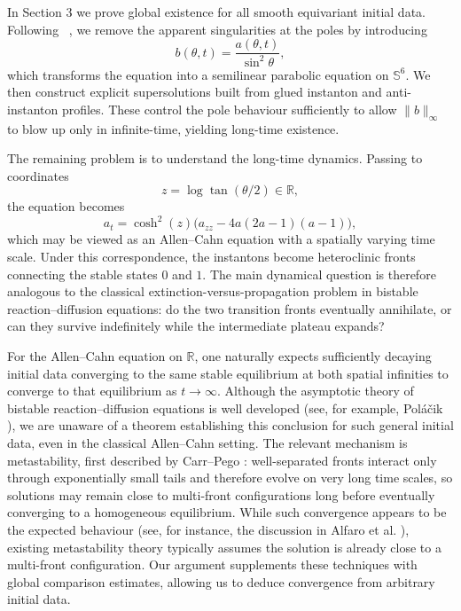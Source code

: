 \documentclass[11pt,a4paper]{article}
\numberwithin{equation}{section}
\theoremstyle{plain}
\theoremstyle{remark}
\begin{document}
In Section 3 we prove global existence for all smooth equivariant initial data. Following ~\cite{67fa8f92-32f2-39c3-bd3f-c407da60a7c7,Waldron2014Thesis}, we remove the apparent singularities at the poles by introducing
$$
b(\theta,t)=\frac{a(\theta,t)}{\sin^2\theta},
$$
which transforms the equation into a semilinear parabolic equation on $\mathbb{S}^6$. We then construct explicit supersolutions built from glued instanton and anti-instanton profiles. These control the pole behaviour sufficiently to allow $\|b\|_\infty$ to blow up only in infinite-time, yielding long-time existence.

The remaining problem is to understand the long-time dynamics. Passing to coordinates
$$
z=\log\tan(\theta/2)\in\mathbb{R},
$$
the equation becomes
\begin{equation}\label{coshAC}
a_t=\cosh^2(z)\bigl(a_{zz}-4a(2a-1)(a-1)\bigr),
\end{equation}
which may be viewed as an Allen–Cahn equation with a spatially varying time scale. Under this correspondence, the instantons become heteroclinic fronts connecting the stable states $0$ and $1$. The main dynamical question is therefore analogous to the classical extinction-versus-propagation problem in bistable reaction–diffusion equations: do the two transition fronts eventually annihilate, or can they survive indefinitely while the intermediate plateau expands?


For the Allen–Cahn equation on $\mathbb R$, one naturally expects sufficiently decaying initial data converging to the same stable equilibrium at both spatial infinities to converge to that equilibrium as $t\to\infty$. Although the asymptotic theory of bistable reaction–diffusion equations is well developed (see, for example, Poláčik \cite{inbook}), we are unaware of a theorem establishing this conclusion for such general initial data, even in the classical Allen–Cahn setting. The relevant mechanism is metastability, first described by Carr–Pego \cite{carr1989metastable}: well-separated fronts interact only through exponentially small tails and therefore evolve on very long time scales, so solutions may remain close to multi-front configurations long before eventually converging to a homogeneous equilibrium. While such convergence appears to be the expected behaviour (see, for instance, the discussion in Alfaro et al. \cite{Alfaro_2024}), existing metastability theory typically assumes the solution is already close to a multi-front configuration. Our argument supplements these techniques with global comparison estimates, allowing us to deduce convergence from arbitrary initial data.
\end{document}

